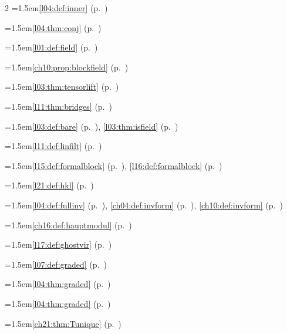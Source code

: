 \begin{multicols}{2}
\hangindent=1.5em\quad \ref{l04:def:inner} (p.~\pageref{l04:def:inner})\par
\hangindent=1.5em\quad \ref{l04:thm:conj} (p.~\pageref{l04:thm:conj})\par
\hangindent=1.5em\quad \ref{l01:def:field} (p.~\pageref{l01:def:field})\par
\hangindent=1.5em\quad \ref{ch10:prop:blockfield} (p.~\pageref{ch10:prop:blockfield})\par
\hangindent=1.5em\quad \ref{l03:thm:tensorlift} (p.~\pageref{l03:thm:tensorlift})\par
\hangindent=1.5em\quad \ref{l11:thm:bridges} (p.~\pageref{l11:thm:bridges})\par
\hangindent=1.5em\quad \ref{l03:def:bare} (p.~\pageref{l03:def:bare}), \ref{l03:thm:isfield} (p.~\pageref{l03:thm:isfield})\par
\hangindent=1.5em\quad \ref{l11:def:linfilt} (p.~\pageref{l11:def:linfilt})\par
\hangindent=1.5em\quad \ref{l15:def:formalblock} (p.~\pageref{l15:def:formalblock}), \ref{l16:def:formalblock} (p.~\pageref{l16:def:formalblock})\par
\hangindent=1.5em\quad \ref{l21:def:hkl} (p.~\pageref{l21:def:hkl})\par
\hangindent=1.5em\quad \ref{l04:def:fullinv} (p.~\pageref{l04:def:fullinv}), \ref{ch04:def:invform} (p.~\pageref{ch04:def:invform}), \ref{ch10:def:invform} (p.~\pageref{ch10:def:invform})\par
\hangindent=1.5em\quad \ref{ch16:def:hauptmodul} (p.~\pageref{ch16:def:hauptmodul})\par
\hangindent=1.5em\quad \ref{l17:def:ghostvir} (p.~\pageref{l17:def:ghostvir})\par
\hangindent=1.5em\quad \ref{l07:def:graded} (p.~\pageref{l07:def:graded})\par
\hangindent=1.5em\quad \ref{l04:thm:graded} (p.~\pageref{l04:thm:graded})\par
\hangindent=1.5em\quad \ref{l04:thm:graded} (p.~\pageref{l04:thm:graded})\par
\hangindent=1.5em\quad \ref{ch21:thm:Tunique} (p.~\pageref{ch21:thm:Tunique})\par

\end{multicols}
